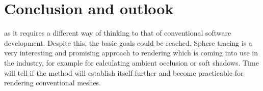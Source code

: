 
\section{Conclusion and outlook}

 as it requires a
different way of thinking to that of conventional software development. Despite
this, the basic goals could be reached. Sphere tracing is a very interesting and
promising approach to rendering which is coming into use in the industry, for
example for calculating ambient occlusion or soft shadows. Time will tell if the
method will establish itself further and become practicable for rendering
conventional meshes.